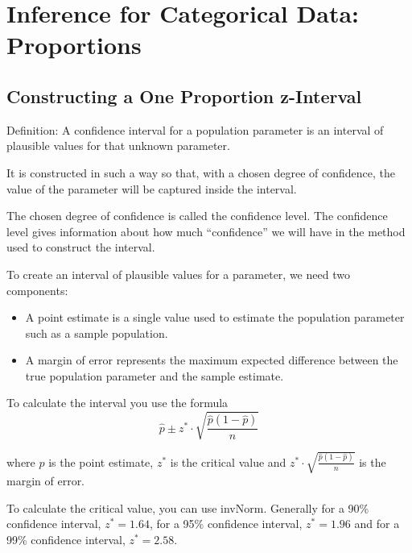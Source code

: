 \documentclass[../stats.tex]{subfiles}
\begin{document}
\chapter{Inference for Categorical Data: Proportions}
\section{Constructing a One Proportion z-Interval}
Definition: A confidence interval for a population parameter is an interval of plausible values for that unknown parameter.

It is constructed in such a way so that, with a chosen degree of confidence, the value of the parameter will be captured inside the interval.

The chosen degree of confidence is called the confidence level. The confidence level gives information about how much ``confidence'' we will have in the method used to construct the interval.

To create an interval of plausible values for a parameter, we need two components:
\begin{itemize}
    \item A point estimate is a single value used to estimate the population parameter such as a sample population.
    \item A margin of error represents the maximum expected difference between the true population parameter and the sample estimate.
\end{itemize}

To calculate the interval you use the formula 
\[ \hat{p}\pm z^*\cdot\sqrt{\frac{\hat{p}(1-\hat{p})}{n}}\]

where $\hat{p}$ is the point estimate, $z^*$ is the critical value and $z^*\cdot\sqrt{\frac{\hat{p}(1-\hat{p})}{n}}$ is the margin of error.

To calculate the critical value, you can use invNorm. Generally for a 90\% confidence interval, $z^*=1.64$, for a 95\% confidence interval, $z^*=1.96$ and for a 99\% confidence interval, $z^*=2.58$.
\end{document}
